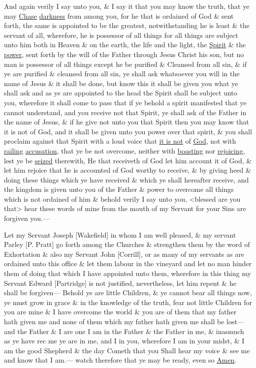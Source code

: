 				And again verily I say unto you, \& I say it that you may know the truth, that ye may \uline{Chase} \uline{darkness} from among you, for he that is ordained of God \& sent forth, the same is appointed to be the greatest, notwithstanding he is least \& the servant of all, wherefore, he is possessor of all things for all things are subject unto him both in Heaven \& on the earth, the life and the light, the \uline{Spirit} \& the \uline{power}, sent forth by the will of the Father through Jesus Christ his son, but no man is possessor of all things except he be purified \& Cleansed from all sin, \& if ye are purified \& cleansed from all sin, ye shall ask whatsoever you will in the name of Jesus \& it shall be done, but know this it shall be given you what ye shall ask and as ye are appointed to the head the Spirit shall be subject unto you, wherefore it shall come to pass that if ye behold a spirit manifested that ye cannot understand, and you receive not that Spirit, ye shall ask of the Father in the name of Jesus, \& if he give not unto you that Spirit then you may know that it is not of God, and it shall be given unto you power over that spirit, \& you shall proclaim against that Spirit with a loud voice that \uline{it is not} of \uline{God}, not with \uline{railing} \uline{accusation}, that ye be not overcome, neither with \uline{boasting} nor \uline{rejoicing}, lest ye be \uline{seized} therewith, He that receiveth of God let him account it of God, \& let him rejoice that he is accounted of God worthy to receive, \& by giving heed \& doing these things which ye have received \& which ye shall hereafter receive, and the kingdom is given unto you of the Father \& power to overcome all things which is not ordained of him \& behold verily I say unto you, <blessed are you that> hear these words of mine from the mouth of my Servant for your Sins are forgiven you.---

				Let my Servant Joseph [Wakefield] in whom I am well pleased, \& my servant Parley [P. Pratt] go forth among the Churches \& strengthen them by the word of Exhortation \& also my Servant John [Corrill], or as many of my servants as are ordained unto this office \& let them labour in the vineyard and let no man hinder them of doing that which I have appointed unto them, wherefore in this thing my Servant Edward [Partridge] is not justified, nevertheless, let him repent \& he shall be forgiven--- Behold ye are little Children, \& ye cannot bear all things now, ye must grow in grace \& in the knowledge of the truth, fear not little Children for you are mine \& I have overcome the world \& you are of them that my father hath given me and none of them which my father hath given me shall be lost--- and the Father \& I are one I am in the Father \& the Father in me, \& inasmuch as ye have rec me ye are in me, and I in you, wherefore I am in your midst, \& I am the good Shepherd \& the day Cometh that you Shall hear my voice \& see me and know that I am.--- watch therefore that ye may be ready, even so \uline{Amen}.


